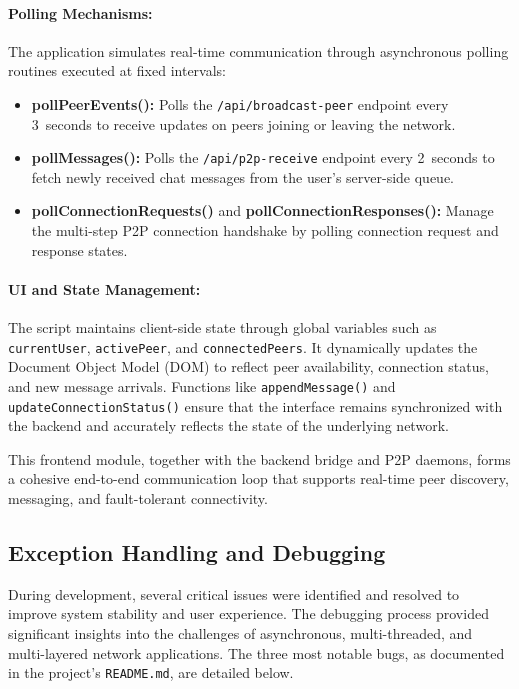 \paragraph{Polling Mechanisms:}
The application simulates real-time communication through asynchronous polling routines executed at fixed intervals:
\begin{itemize}
    \item \textbf{pollPeerEvents():} Polls the \texttt{/api/broadcast-peer} endpoint every 3~seconds to receive updates on peers joining or leaving the network.
    \item \textbf{pollMessages():} Polls the \texttt{/api/p2p-receive} endpoint every 2~seconds to fetch newly received chat messages from the user’s server-side queue.
    \item \textbf{pollConnectionRequests()} and \textbf{pollConnectionResponses():} Manage the multi-step P2P connection handshake by polling connection request and response states.
\end{itemize}

\paragraph{UI and State Management:}
The script maintains client-side state through global variables such as \texttt{currentUser}, \texttt{activePeer}, and \texttt{connectedPeers}. 
It dynamically updates the Document Object Model (DOM) to reflect peer availability, connection status, and new message arrivals. 
Functions like \texttt{appendMessage()} and \texttt{updateConnectionStatus()} ensure that the interface remains synchronized with the backend and accurately reflects the state of the underlying network.

This frontend module, together with the backend bridge and P2P daemons, forms a cohesive end-to-end communication loop that supports real-time peer discovery, messaging, and fault-tolerant connectivity.


\subsection{Exception Handling and Debugging}

During development, several critical issues were identified and resolved to improve system stability and user experience. 
The debugging process provided significant insights into the challenges of asynchronous, multi-threaded, and multi-layered network applications. 
The three most notable bugs, as documented in the project’s \texttt{README.md}, are detailed below.

